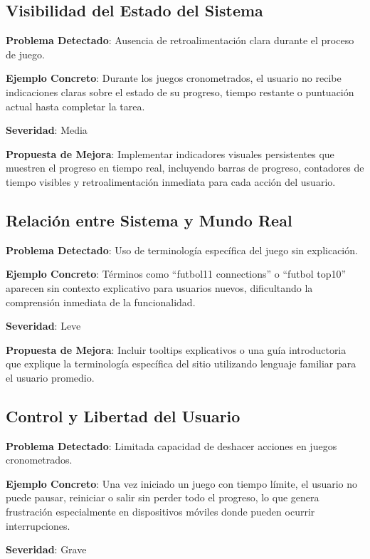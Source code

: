 \documentclass{article}
\begin{document}
	\subsection{Visibilidad del Estado del Sistema}
	\noindent
	\textbf{Problema Detectado}: Ausencia de retroalimentación clara durante el proceso de juego.
	
	\noindent
	\textbf{Ejemplo Concreto}: Durante los juegos cronometrados, el usuario no recibe indicaciones claras sobre el estado de su progreso, tiempo restante o puntuación actual hasta completar la tarea.
	
	\noindent
	\textbf{Severidad}: Media
	
	\noindent
	\textbf{Propuesta de Mejora}: Implementar indicadores visuales persistentes que muestren el progreso en tiempo real, incluyendo barras de progreso, contadores de tiempo visibles y retroalimentación inmediata para cada acción del usuario.

	\subsection{Relación entre Sistema y Mundo Real}
	\noindent
	\textbf{Problema Detectado}: Uso de terminología específica del juego sin explicación.
	
	\noindent
	\textbf{Ejemplo Concreto}: Términos como ``futbol11 connections'' o ``futbol top10'' aparecen sin contexto explicativo para usuarios nuevos, dificultando la comprensión inmediata de la funcionalidad.
	
	\noindent
	\textbf{Severidad}: Leve
	
	\noindent
	\textbf{Propuesta de Mejora}: Incluir tooltips explicativos o una guía introductoria que explique la terminología específica del sitio utilizando lenguaje familiar para el usuario promedio.

	\subsection{Control y Libertad del Usuario}
	\noindent
	\textbf{Problema Detectado}: Limitada capacidad de deshacer acciones en juegos cronometrados.
	
	\noindent
	\textbf{Ejemplo Concreto}: Una vez iniciado un juego con tiempo límite, el usuario no puede pausar, reiniciar o salir sin perder todo el progreso, lo que genera frustración especialmente en dispositivos móviles donde pueden ocurrir interrupciones.
	
	\noindent
	\textbf{Severidad}: Grave
	
\end{document}
